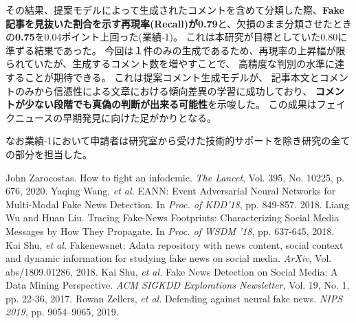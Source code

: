 {	その結果、提案モデルによって生成されたコメントを含めて分類した際、\textbf{Fake記事を見抜いた割合を示す再現率(Recall)が0.79}と、欠損のまま分類させたときの\textbf{0.75}を0.04ポイント上回った(業績-1)。
	これは本研究が目標としていた0.80に準ずる結果であった。
	今回は１件のみの⽣成であるため、再現率の上昇幅が限られていたが、⽣成するコメント数を増やすことで、
	⾼精度な判別の⽔準に達することが期待できる。
	これは提案コメント生成モデルが、
	記事本文とコメントのみから信憑性による文章における傾向差異の学習に成功しており、
	\textbf{コメントが少ない段階でも真偽の判断が出来る可能性}を示唆した。
	この成果はフェイクニュースの早期発⾒に向けた足がかりとなる。

	なお業績-1において申請者は研究室から受けた技術的サポートを除き研究の全ての部分を担当した。

	{\footnotesize 
	\begin{thebibliography}{99}
		\setlength{\parskip}{0cm}
		\setlength{\itemsep}{0cm}
		\begin{spacing}{0.6}
		 John Zarocostas. How to fight an infodemic. \textit{The Lancet}, Vol. 395, No. 10225, p. 676, 2020.
		 Yaqing Wang, \textit{et al.} EANN: Event Adversarial Neural Networks for Multi-Modal Fake News Detection. In \textit{Proc. of KDD'18}, pp. 849-857. 2018.
		 Liang Wu and Huan Liu. Tracing Fake-News Footprints: Characterizing Social Media Messages by How They Propagate. In \textit{Proc. of WSDM '18},  pp. 637-645, 2018.
		 Kai Shu, \textit{et al.} Fakenewsnet: Adata repository with news content, social context and dynamic information for studying fake news on social media. \textit{ArXiv}, Vol. abs/1809.01286, 2018.
		 Kai Shu, \textit{et al.} Fake News Detection on Social Media: A Data Mining Perspective. \textit{ACM SIGKDD Explorations Newsletter}, Vol. 19, No. 1, pp. 22-36, 2017.
		 Rowan Zellers, \textit{et al.} Defending against neural fake news. \textit{NIPS 2019}, pp. 9054–9065, 2019.
		\end{spacing}
	\end{thebibliography}
	}
}

